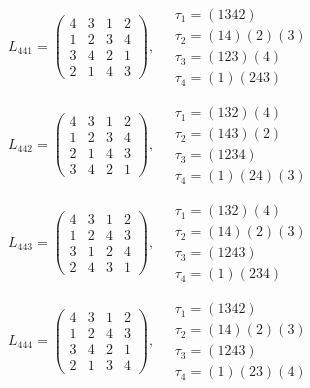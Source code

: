 $L_{441} = \begin{pmatrix} 4 & 3 & 1 & 2 \\ 1 & 2 & 3 & 4 \\ 3 & 4 & 2 & 1 \\ 2 & 1 & 4 & 3 \end{pmatrix}, \quad \begin{matrix} \tau_{1} = (1 3 4 2) \\ \tau_{2} = (1 4)(2)(3) \\ \tau_{3} = (1 2 3)(4) \\ \tau_{4} = (1)(2 4 3) \end{matrix}$

$L_{442} = \begin{pmatrix} 4 & 3 & 1 & 2 \\ 1 & 2 & 3 & 4 \\ 2 & 1 & 4 & 3 \\ 3 & 4 & 2 & 1 \end{pmatrix}, \quad \begin{matrix} \tau_{1} = (1 3 2)(4) \\ \tau_{2} = (1 4 3)(2) \\ \tau_{3} = (1 2 3 4) \\ \tau_{4} = (1)(2 4)(3) \end{matrix}$

$L_{443} = \begin{pmatrix} 4 & 3 & 1 & 2 \\ 1 & 2 & 4 & 3 \\ 3 & 1 & 2 & 4 \\ 2 & 4 & 3 & 1 \end{pmatrix}, \quad \begin{matrix} \tau_{1} = (1 3 2)(4) \\ \tau_{2} = (1 4)(2)(3) \\ \tau_{3} = (1 2 4 3) \\ \tau_{4} = (1)(2 3 4) \end{matrix}$

$L_{444} = \begin{pmatrix} 4 & 3 & 1 & 2 \\ 1 & 2 & 4 & 3 \\ 3 & 4 & 2 & 1 \\ 2 & 1 & 3 & 4 \end{pmatrix}, \quad \begin{matrix} \tau_{1} = (1 3 4 2) \\ \tau_{2} = (1 4)(2)(3) \\ \tau_{3} = (1 2 4 3) \\ \tau_{4} = (1)(2 3)(4) \end{matrix}$


